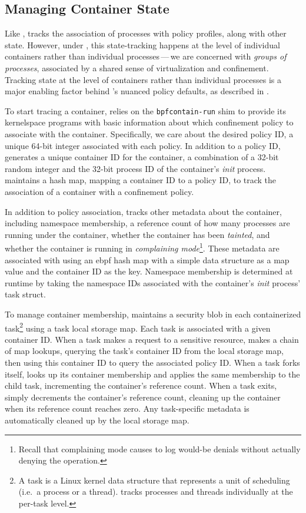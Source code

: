 \subsection{Managing Container State}%
\label{ss:bpfcontain-state}

Like \bpfbox{}, \bpfcontain{} tracks the association of processes with policy profiles,
along with other state. However, under \bpfcontain{}, this state-tracking happens
at the level of individual containers rather than individual processes\,---\,we are
concerned with \textit{groups of processes}, associated by a shared sense of
virtualization and confinement. Tracking state at the level of containers rather than
individual processes is a major enabling factor behind \bpfcontain{}'s nuanced policy
defaults, as described in .

To start tracing a container, \bpfcontain{} relies on the \texttt{bpfcontain-run} shim to
provide its kernelspace programs with basic information about which confinement policy to
associate with the container. Specifically, we care about the desired policy ID, a unique
64-bit integer associated with each \bpfcontain{} policy. In addition to a policy ID,
\bpfcontain{} generates a unique container ID for the container, a combination of a 32-bit
random integer and the 32-bit process ID of the container's \textit{init} process.
\bpfcontain{} maintains a hash map, mapping a container ID to a policy ID, to track the
association of a container with a confinement policy.

In addition to policy association, \bpfcontain{} tracks other metadata about the
container, including namespace membership, a reference count of how many processes are
running under the container, whether the container has been \textit{tainted}, and whether
the container is running in \textit{complaining mode}\footnote{Recall that complaining
mode causes \bpfcontain{} to log would-be denials without actually denying the
operation.}. These metadata are associated with using an \gls{ebpf} hash map with a simple
data structure as a map value and the container ID as the key. Namespace membership is
determined at runtime by taking the namespace IDs associated with the container's
\textit{init} process' task struct.

To manage container membership, \bpfcontain{} maintains a security blob in each
containerized task\footnote{A task is a Linux kernel data structure that represents a unit of
scheduling (i.e.~a process or a thread). \bpfcontain{} tracks processes and threads
individually at the per-task level.} using a task local storage map. Each task is
associated with a given container ID. When a task makes a request to a sensitive resource,
\bpfcontain{} makes a chain of map lookups, querying the task's container ID from the
local storage map, then using this container ID to query the associated policy ID. When
a task forks itself, \bpfcontain{} looks up its container membership and applies the same
membership to the child task, incrementing the container's reference count. When a task
exits, \bpfcontain{} simply decrements the container's reference count, cleaning up the
container when its reference count reaches zero. Any task-specific metadata is
automatically cleaned up by the local storage map.

